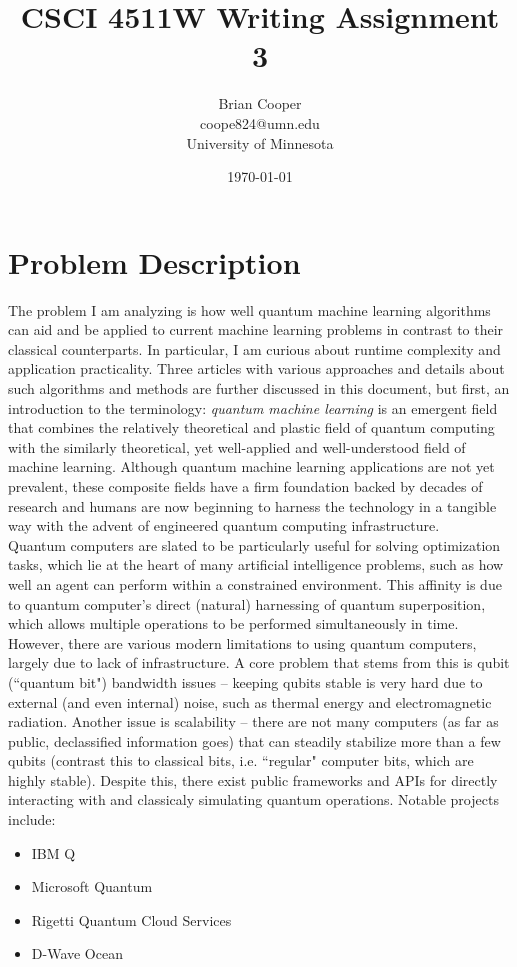 \documentclass{article}
\title{CSCI 4511W Writing Assignment 3}
\author{Brian Cooper \\ coope824@umn.edu \\ University of Minnesota}
\date{\today}
\newcommand{\ind}{\setlength\itemindent{25pt}}
\begin{document}
\maketitle

\section{Problem Description}
  The problem I am analyzing is how well quantum machine learning algorithms can aid and be applied to current machine learning problems in contrast to their classical counterparts. In particular, I am curious about runtime complexity and application practicality. Three articles with various approaches and details about such algorithms and methods are further discussed in this document, but first, an introduction to the terminology: \textit{quantum machine learning} is an emergent field that combines the relatively theoretical and plastic field of quantum computing with the similarly theoretical, yet well-applied and well-understood field of machine learning. Although quantum machine learning applications are not yet prevalent, these composite fields have a firm foundation backed by decades of research and humans are now beginning to harness the technology in a tangible way with the advent of engineered quantum computing infrastructure. \\

  Quantum computers are slated to be particularly useful for solving optimization tasks, which lie at the heart of many artificial intelligence problems, such as how well an agent can perform within a constrained environment. This affinity is due to quantum computer's direct (natural) harnessing of quantum superposition, which allows multiple operations to be performed simultaneously in time. However, there are various modern limitations to using quantum computers, largely due to lack of infrastructure. A core problem that stems from this is qubit (``quantum bit") bandwidth issues -- keeping qubits stable is very hard due to external (and even internal) noise, such as thermal energy and electromagnetic radiation. Another issue is scalability -- there are not many computers (as far as public, declassified information goes) that can steadily stabilize more than a few qubits (contrast this to classical bits, i.e. ``regular" computer bits, which are highly stable). Despite this, there exist public frameworks and APIs for directly interacting with and classicaly simulating quantum operations. Notable projects include:
    \begin{itemize}
      \ind
      \item IBM Q~\cite{ibm}
      \item Microsoft Quantum~\cite{msft}
      \item Rigetti Quantum Cloud Services~\cite{rigetti}
      \item D-Wave Ocean~\cite{dwave}
    \end{itemize}
\end{document}
